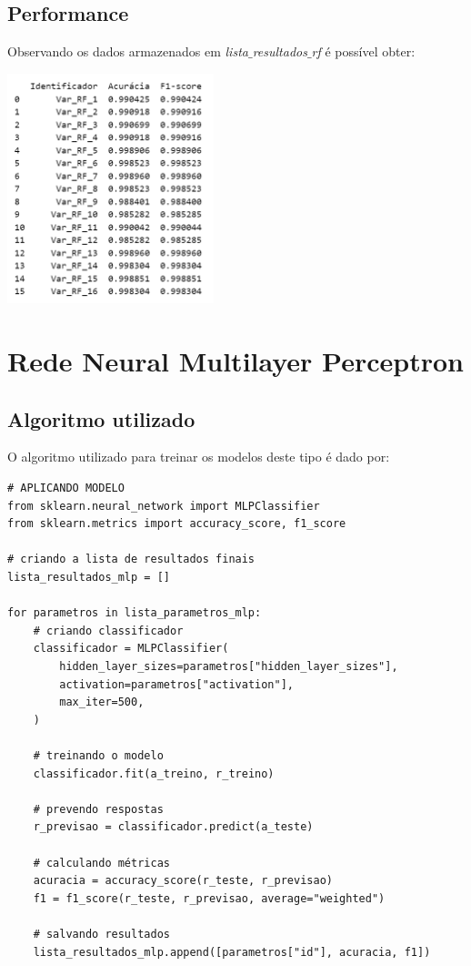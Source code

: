 \documentclass[12pt,a4paper]{article}
\begin{document}
\subsection{Performance}

\quad\space Observando os dados armazenados em \textit{lista$\_$resultados$\_$rf} é possível obter:

\begin{center}
	\includegraphics[width=6cm]{imagem/rfr.png}
\end{center}

\newpage
\section{Rede Neural Multilayer Perceptron}

\subsection{Algoritmo utilizado}

\quad\space O algoritmo utilizado para treinar os modelos deste tipo é dado por:

\begin{mdframed}
	\begin{verbatim}
# APLICANDO MODELO
from sklearn.neural_network import MLPClassifier
from sklearn.metrics import accuracy_score, f1_score

# criando a lista de resultados finais
lista_resultados_mlp = []

for parametros in lista_parametros_mlp:
	# criando classificador
	classificador = MLPClassifier(
		hidden_layer_sizes=parametros["hidden_layer_sizes"],
		activation=parametros["activation"],
		max_iter=500,
	)
	
	# treinando o modelo
	classificador.fit(a_treino, r_treino)
	
	# prevendo respostas
	r_previsao = classificador.predict(a_teste)
	
	# calculando métricas
	acuracia = accuracy_score(r_teste, r_previsao)
	f1 = f1_score(r_teste, r_previsao, average="weighted")
	
	# salvando resultados
	lista_resultados_mlp.append([parametros["id"], acuracia, f1])
	\end{verbatim}
\end{mdframed}
\end{document}
